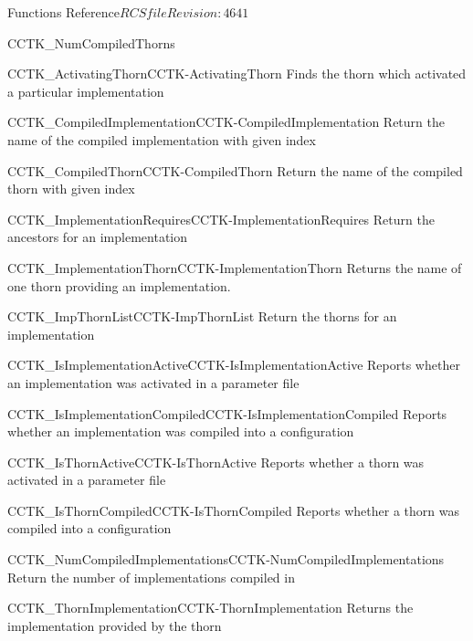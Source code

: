 \begin{cactuspart}{ Functions Reference}{$RCSfile$}{$Revision: 4641 $}
\begin{FunctionDescription}{CCTK\_NumCompiledThorns}
\begin{SeeAlsoSection}
\begin{SeeAlso2}{CCTK\_ActivatingThorn}{CCTK-ActivatingThorn}
  Finds the thorn which activated a particular implementation
\end{SeeAlso2}
\begin{SeeAlso2}{CCTK\_CompiledImplementation}{CCTK-CompiledImplementation}
  Return the name of the compiled implementation with given index
\end{SeeAlso2}
\begin{SeeAlso2}{CCTK\_CompiledThorn}{CCTK-CompiledThorn}
  Return the name of the compiled thorn with given index
\end{SeeAlso2}
\begin{SeeAlso2}{CCTK\_ImplementationRequires}{CCTK-ImplementationRequires}
  Return the ancestors for an implementation
\end{SeeAlso2}
\begin{SeeAlso2}{CCTK\_ImplementationThorn}{CCTK-ImplementationThorn}
  Returns the name of one thorn providing an implementation.
\end{SeeAlso2}
\begin{SeeAlso2}{CCTK\_ImpThornList}{CCTK-ImpThornList}
  Return the thorns for an implementation
\end{SeeAlso2}
\begin{SeeAlso2}{CCTK\_IsImplementationActive}{CCTK-IsImplementationActive}
  Reports whether an implementation was activated in a parameter file
\end{SeeAlso2}
\begin{SeeAlso2}{CCTK\_IsImplementationCompiled}{CCTK-IsImplementationCompiled}
  Reports whether an implementation was compiled into a configuration
\end{SeeAlso2}
\begin{SeeAlso2}{CCTK\_IsThornActive}{CCTK-IsThornActive}
  Reports whether a thorn was activated in a parameter file
\end{SeeAlso2}
\begin{SeeAlso2}{CCTK\_IsThornCompiled}{CCTK-IsThornCompiled}
  Reports whether a thorn was compiled into a configuration
\end{SeeAlso2}
\begin{SeeAlso2}{CCTK\_NumCompiledImplementations}{CCTK-NumCompiledImplementations}
  Return the number of implementations compiled in
\end{SeeAlso2}
\begin{SeeAlso2}{CCTK\_ThornImplementation}{CCTK-ThornImplementation}
  Returns the implementation provided by the thorn
\end{SeeAlso2}
\end{SeeAlsoSection}


\end{FunctionDescription}
\end{cactuspart}

